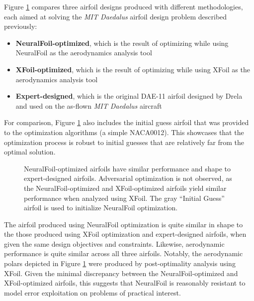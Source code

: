\documentclass[journal]{new-aiaa}
\begin{document}
Figure \ref{fig:daedalus_optimized} compares three airfoil designs produced with different methodologies, each aimed at solving the \emph{MIT Daedalus} airfoil design problem described previously:

\begin{itemize}
    \item \textbf{NeuralFoil-optimized}, which is the result of optimizing while using NeuralFoil as the aerodynamics analysis tool
    \item \textbf{XFoil-optimized}, which is the result of optimizing while using XFoil as the aerodynamics analysis tool
    \item \textbf{Expert-designed}, which is the original DAE-11 airfoil designed by Drela \cite{drelaLowReynoldsnumberAirfoilDesign1988} and used on the as-flown \emph{MIT Daedalus} aircraft
\end{itemize}

For comparison, Figure \ref{fig:daedalus_optimized} also includes the initial guess airfoil that was provided to the optimization algorithms (a simple NACA0012). This showcases that the optimization process is robust to initial guesses that are relatively far from the optimal solution.

\begin{figure}[H]
    \centering
    
    \caption{NeuralFoil-optimized airfoils have similar performance and shape to expert-designed airfoils. Adversarial optimization is not observed, as the NeuralFoil-optimized and XFoil-optimized airfoils yield similar performance when analyzed using XFoil. The gray ``Initial Guess'' airfoil is used to initialize NeuralFoil optimization.}
    \label{fig:daedalus_optimized}
\end{figure}

The airfoil produced using NeuralFoil optimization is quite similar in shape to the those produced using XFoil optimization and expert-designed airfoils, when given the same design objectives and constraints. Likewise, aerodynamic performance is quite similar across all three airfoils. Notably, the aerodynamic polars depicted in Figure \ref{fig:daedalus_optimized} were produced by post-optimality analysis using XFoil. Given the minimal discrepancy between the NeuralFoil-optimized and XFoil-optimized airfoils, this suggests that NeuralFoil is reasonably resistant to model error exploitation on problems of practical interest.
\end{document}
